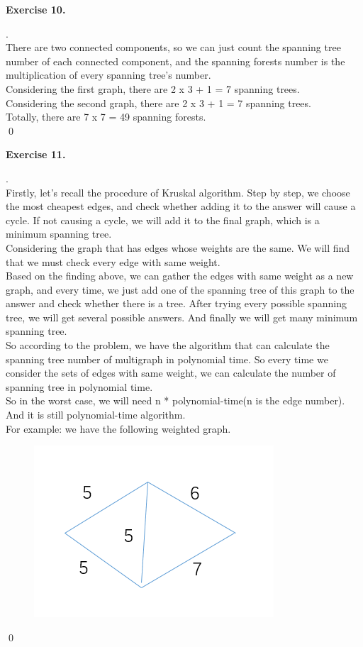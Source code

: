 \documentclass[12pt, notitlepage]{article}
\newenvironment{sol}
  {\par\vspace{3mm}\noindent{\it Solution}.}{\qed}
\begin{document}
\textbf{Exercise 10.}
\begin{sol}\\
There are two connected components, so we can just count the spanning tree number of each connected component, and the spanning forests number is the multiplication of every spanning tree's number.\\
Considering the first graph, there are 2 x 3 + 1 = 7 spanning trees.\\
Considering the second graph, there are 2 x 3 + 1 = 7 spanning trees.\\
Totally, there are 7 x 7 = 49 spanning forests.\\
\end{sol}

\textbf{Exercise 11.}
\begin{sol}\\
Firstly, let's recall the procedure of Kruskal algorithm. Step by step, we choose the most cheapest edges, and check whether adding it to the answer will cause a cycle. If not causing a cycle, we will add it to the final graph, which is a minimum spanning tree.\\
Considering the graph that has edges whose weights are the same. We will find that we must check every edge with same weight.\\
Based on the finding above, we can gather the edges with same weight as a new graph, and every time, we just add one of the spanning tree of this graph to the answer and check whether there is a tree. After trying every possible spanning tree, we will get several possible answers. And finally we will get many minimum spanning tree.\\
So according to the problem, we have the algorithm that can calculate the spanning tree number of multigraph in polynomial time. So every time we consider the sets of edges with same weight, we can calculate the number of spanning tree in polynomial time.\\
So in the worst case, we will need n * polynomial-time(n is the edge number). And it is still polynomial-time algorithm.\\
For example: we have the following weighted graph.\\
\begin{figure}[H]
	\center
	\includegraphics[width=0.4\linewidth]{11-1.png}\vspace{-10pt}

\end{figure}
\end{sol}
\end{document}
